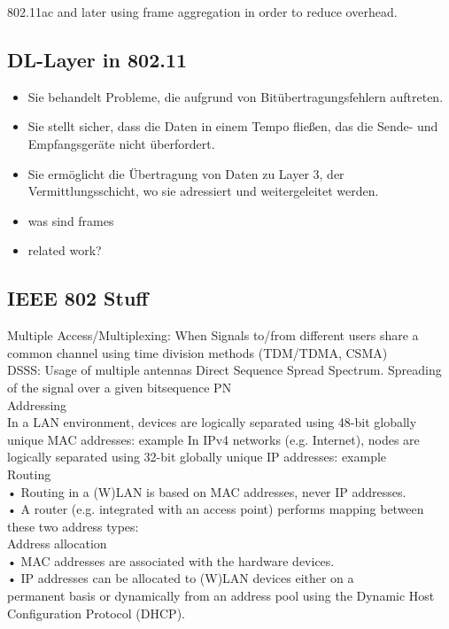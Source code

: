 \documentclass[]{ccs-thesis}
\begin{document}
802.11ac and later using frame aggregation in order to reduce overhead.

\subsection{DL-Layer in 802.11}

\begin{itemize}
	\item Sie behandelt Probleme, die aufgrund von Bitübertragungsfehlern auftreten.
	\item Sie stellt sicher, dass die Daten in einem Tempo fließen, das die Sende- und Empfangsgeräte nicht überfordert.
	\item Sie ermöglicht die Übertragung von Daten zu Layer 3, der Vermittlungsschicht, wo sie adressiert und weitergeleitet werden.
	\item was sind frames
	\item related work?
\end{itemize}

\subsection{IEEE 802 Stuff}
Multiple Access/Multiplexing: When Signals to/from different users share a common channel using time division methods (TDM/TDMA, CSMA)\\

DSSS: Usage of multiple antennas
Direct Sequence Spread Spectrum. Spreading of the signal over a given bitsequence PN\\

Addressing\\
In a LAN environment, devices are logically separated using 48-bit
globally unique MAC addresses: example
In IPv4 networks (e.g. Internet), nodes are logically separated
using 32-bit globally unique IP addresses: example \\

Routing\\
• Routing in a (W)LAN is based on MAC addresses, never IP addresses.\\
• A router (e.g. integrated with an access point) performs mapping between\\
these two address types: \\

Address allocation\\
• MAC addresses are associated with the hardware devices.\\
• IP addresses can be allocated to (W)LAN devices either on a\\
permanent basis or dynamically from an address pool using the
Dynamic Host Configuration Protocol (DHCP). \\
\end{document}
